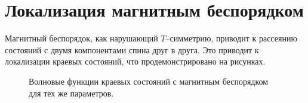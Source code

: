 \documentclass{article}
\begin{document}
    \section{Локализация магнитным беспорядком}
    Магнитный беспорядок, как нарушающий $T$--симметрию, приводит к рассеянию состояний
    с двумя компонентами спина друг в друга. Это приводит к локализации краевых состояний,
    что продемонстрировано на рисунках.
    \begin{figure}[h]
        \centering
        \begin{minipage}[h]{0.9\linewidth}
        \end{minipage}
        \begin{minipage}[h]{0.9\linewidth}
        \end{minipage}
        \begin{minipage}[h]{0.9\linewidth}
        \end{minipage}
        \caption{
            Волновые функции краевых состояний с магнитным беспорядком 
            для тех же параметров.
            }
    \end{figure}
\end{document}
